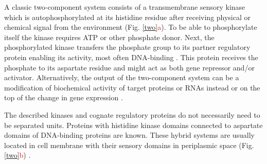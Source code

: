 A classic two-component system consists of a transmembrane sensory kinase which is autophosphorylated at its histidine residue after receiving physical or chemical signal from the environment (Fig. \ref{two}\textcolor{red}{a}).
To be able to phosphorylate itself the kinase requires ATP or other phosphate donor.
Next, the phosphorylated kinase transfers the phosphate group to its partner regulatory protein enabling its activity, most often DNA-binding \cite{lynch2012prioritization, gao2015temporal, cui2018novel}.
This protein receives the phosphate to its aspartate residue and might act as both gene repressor and/or activator.
Alternatively, the output of the two-component system can be a modification of biochemical activity of target proteins or RNAs instead or on the top of the change in gene expression \cite{shu2002antar, chambonnier2016hybrid}.

The described kinases and cognate regulatory proteins do not necessarily need to be separated units.
Proteins with histidine kinase domains connected to aspartate domains of DNA-binding proteins are known.
These hybrid systems are usually located in cell membrane with their sensory domains in periplasmic space (Fig. \ref{two}\textcolor{red}{b}) \cite{lynch2012prioritization, hirano2013regulon}.

